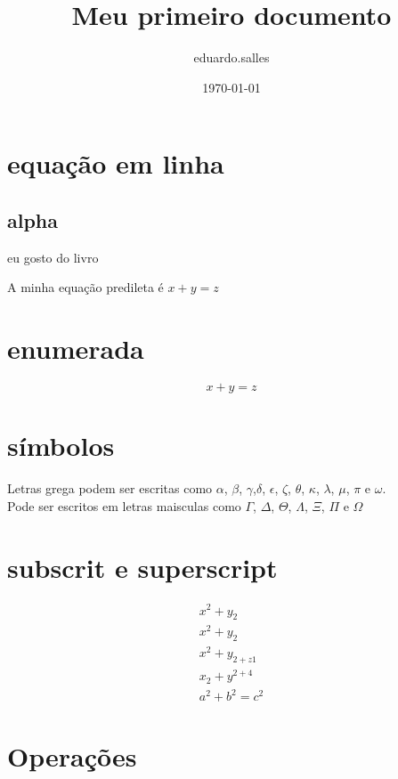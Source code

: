 \documentclass[lipt]{article}
\title{Meu primeiro documento}
\author{eduardo.salles}
\date{\today}
\begin{document}
\maketitle


\section{equação em linha}

\subsection{alpha}

eu gosto do livro\cite{textbook}




A minha equação predileta é $x + y = z$

\section{enumerada}
\begin{equation}
x + y = z
\end{equation}

\section{símbolos}

Letras grega podem ser escritas como $\alpha$, $\beta$, $\gamma$,$\delta$, $\epsilon$, $\zeta$, $\theta$, $\kappa$, $\lambda$, $\mu$, $\pi$ e $\omega$.\\
Pode ser escritos em letras maisculas como $\Gamma$, $\Delta$, $\Theta$, $\Lambda$, $\Xi$, $\Pi$ e $\Omega$\\


\section{subscrit e superscript}

\begin{align}
x^2 + y_2 \\
x^{2} + y_2 \\
x^{2} + y_{2 + z1} \\
x_{2} + y^{2+4} \\
a^2 + b^2 = c^2
\end{align}

\section{Operações}
        
\end{document}

